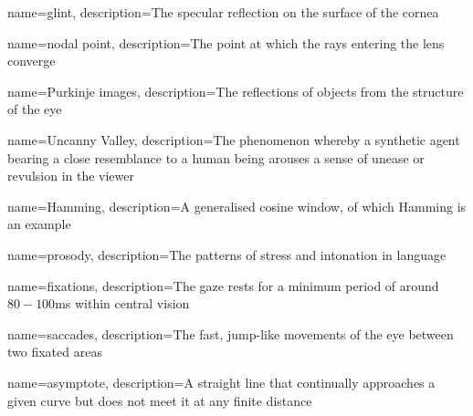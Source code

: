 {
name=glint,
description={The specular reflection on the surface of the cornea}
}

{
name={nodal point},
description={The point at which the rays entering the lens converge}
}

{
name={Purkinje images},
description={The reflections of objects from the structure of the eye}
}


{
name=Uncanny Valley,
description={The phenomenon whereby a synthetic agent bearing a close resemblance to a human being arouses a sense of unease or revulsion in the viewer}
}

{
name=Hamming,
description={A generalised cosine window, of which Hamming is an example}
}

{
name=prosody,
description={The patterns of stress and intonation in language}
}

{
name=fixations,
description={The gaze rests for a minimum period of around $80-100$ms within central vision}
}


{
name=saccades,
description={The fast, jump-like movements of the eye between two fixated areas}
}

{
name=asymptote,
description={A straight line that continually approaches a given curve but does not meet it at any finite distance}
}

